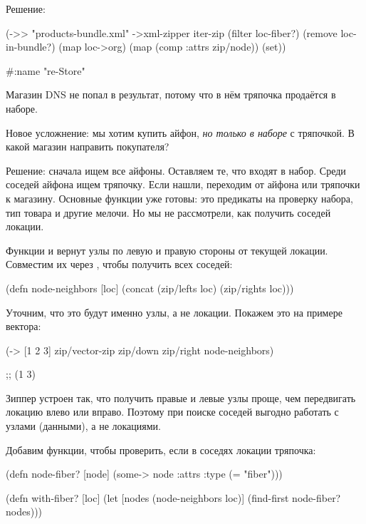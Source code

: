 Решение:

\begin{english}
  \begin{clojure}
(->> "products-bundle.xml"
     ->xml-zipper
     iter-zip
     (filter loc-fiber?)
     (remove loc-in-bundle?)
     (map loc->org)
     (map (comp :attrs zip/node))
     (set))

#{{:name "re-Store"}}
  \end{clojure}
\end{english}

Магазин DNS не попал в результат, потому что в нём тряпочка продаётся в наборе.

Новое усложнение: мы хотим купить айфон, \emph{но только в наборе} с тряпочкой. В
какой магазин направить покупателя?

Решение: сначала ищем все айфоны. Оставляем те, что входят в набор. Среди
соседей айфона ищем тряпочку. Если нашли, переходим от айфона или тряпочки к
магазину. Основные функции уже готовы: это предикаты на проверку набора, тип
товара и другие мелочи. Но мы не рассмотрели, как получить соседей локации.

Функции  и  вернут узлы по левую и правую стороны от
текущей локации. Совместим их через , чтобы получить всех соседей:

\begin{english}
  \begin{clojure}
(defn node-neighbors [loc]
  (concat (zip/lefts loc)
          (zip/rights loc)))
  \end{clojure}
\end{english}

Уточним, что это будут именно узлы, а не локации. Покажем это на примере
вектора:

\begin{english}
  \begin{clojure}
(-> [1 2 3]
    zip/vector-zip
    zip/down
    zip/right
    node-neighbors)

;; (1 3)
  \end{clojure}
\end{english}

Зиппер устроен так, что получить правые и левые узлы проще, чем передвигать
локацию влево или вправо. Поэтому при поиске соседей выгодно работать с узлами
(данными), а не локациями.

Добавим функции, чтобы проверить, если в соседях локации тряпочка:

\begin{english}
  \begin{clojure}
(defn node-fiber? [node]
  (some-> node :attrs :type (= "fiber")))

(defn with-fiber? [loc]
  (let [nodes (node-neighbors loc)]
    (find-first node-fiber? nodes)))
  \end{clojure}
\end{english}

